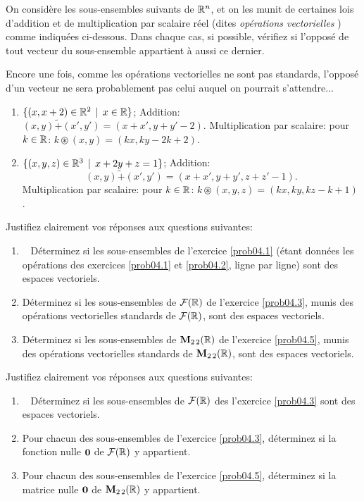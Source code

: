 \begin{prob} \label{prob04.9}  On considère les sous-ensembles
suivants de $\mathbb{R}^n$, et on les munit de certaines lois d'addition et de
multiplication par scalaire réel (dites {\emph{ opérations vectorielles } }) comme indiquées ci-dessous. Dans chaque cas, si
possible, vérifiez si l'opposé de tout vecteur du sous-ensemble appartient à aussi ce dernier.

Encore une fois, comme les opérations vectorielles ne sont pas standards, l'opposé d'un vecteur ne sera probablement pas
celui auquel on pourrait s'attendre...

\begin{enumerate}
\item
  $\{(x, x+2) \in \mathbb{R}^2\, \mid \, x\in \mathbb{R}\}$; Addition:
  $(x,y) \tilde+ (x',y')=(x+x', y+y'-2)$. Multiplication par scalaire: pour $k\in \mathbb{R}$: $k\circledast (x,y)=(kx, ky-2k+2)$.
\item
  $\{(x, y, z) \in \mathbb{R}^3\, \mid \, x+2y+z=1 \}$; Addition:
  \[(x,y) \tilde+ (x',y')=(x+x', y+y',z+z'-1).\] Multiplication par scalaire: pour $k\in \mathbb{R}$:
  $k\circledast (x,y,z)=(kx, ky, kz-k+1)$.
\end{enumerate}
\end{prob}

\begin{prob} \label{prob04.10} Justifiez clairement vos
réponses aux questions suivantes:

\begin{enumerate}
\item\sov~
  Déterminez si les sous-ensembles de l'exercice \ref{prob04.1} (étant données les
  opérations des exercices \ref{prob04.1} et \ref{prob04.2}, ligne par ligne) sont des espaces vectoriels.
\item
  Déterminez si les sous-ensembles de $\mathcal{F}(\mathbb{R})$ de l'exercice \ref{prob04.3},
  munis des opérations vectorielles standards de $\mathcal{F}(\mathbb{R})$, sont des
  espaces vectoriels.
\item
  Déterminez si les sous-ensembles de $\mathbf{M}_{2 \,2}(\mathbb{R})$ de l'exercice \ref{prob04.5}, munis des opérations vectorielles standards de $\mathbf{M}_{2 \,2}(\mathbb{R})$,
  sont des espaces vectoriels.
\end{enumerate}
\end{prob}

\begin{prob} \label{prob04.11} Justifiez clairement vos
réponses aux questions suivantes:

\begin{enumerate}
\item\sov~
  Déterminez si les sous-ensembles de $\mathcal{F}(\mathbb{R})$ des l'exercice \ref{prob04.3} sont
  des espaces vectoriels.
\item
  Pour chacun des
  sous-ensembles de l'exercice \ref{prob04.3}, déterminez si la fonction nulle $\mathbf{0}$ de $\mathcal{F}(\mathbb{R})$ y appartient.
\item
  Pour chacun des sous-ensembles de l'exercice \ref{prob04.5}, déterminez si la matrice nulle $\mathbf{0}$ de $\mathbf{M}_{2 \,2}(\mathbb{R})$ y appartient.
\end{enumerate}
\end{prob}

